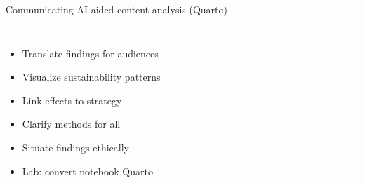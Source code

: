 \documentclass[aspectratio=169]{beamer}
\newcommand{\TitleFont}{\rmfamily}
\begin{document}
\begin{frame}[t]{}
  \vspace*{0.5cm}
  {\TitleFont\fontsize{18}{22}\selectfont\color{LUBronze}Communicating AI-aided content analysis (Quarto)\par}
  \vspace{0.3em}
  {\color{LUBronze}\rule{\linewidth}{0.8pt}}\par
  \vspace{0.2cm}
  \begin{columns}[t]
    \begin{column}[t]{0.4\textwidth}
      \vspace*{0pt}
      \begin{itemize}\setlength\itemsep{0.65em}
        \item Translate findings for audiences
        \item Visualize sustainability patterns
        \item Link effects to strategy
        \item Clarify methods for all
        \item Situate findings ethically
        \item Lab: convert notebook Quarto
      \end{itemize}
    \end{column}
  \end{columns}
\end{frame}
\end{document}

